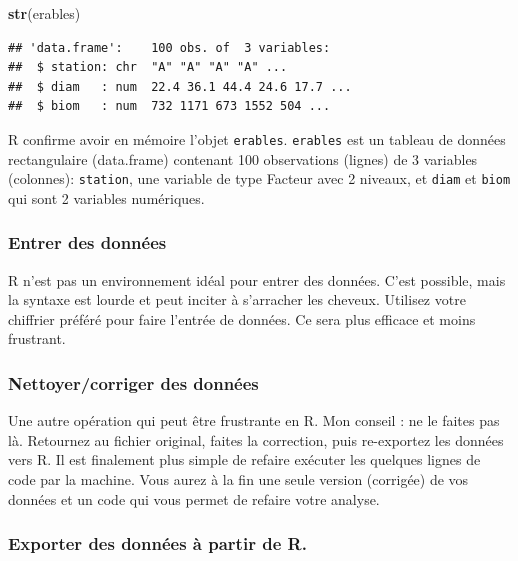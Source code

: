 \documentclass[12pt,]{book}
\newenvironment{Shaded}{\begin{snugshade}}{\end{snugshade}}
\newcommand{\KeywordTok}[1]{\textcolor[rgb]{0.13,0.29,0.53}{\textbf{#1}}}
\newcommand{\NormalTok}[1]{#1}
\begin{document}
\begin{Shaded}
\begin{Highlighting}[]
\KeywordTok{str}\NormalTok{(erables)}
\end{Highlighting}
\end{Shaded}

\begin{verbatim}
## 'data.frame':    100 obs. of  3 variables:
##  $ station: chr  "A" "A" "A" "A" ...
##  $ diam   : num  22.4 36.1 44.4 24.6 17.7 ...
##  $ biom   : num  732 1171 673 1552 504 ...
\end{verbatim}

R confirme avoir en mémoire l'objet \texttt{erables}.
\texttt{erables} est un tableau de données rectangulaire (data.frame) contenant 100 observations (lignes) de 3 variables (colonnes): \texttt{station}, une variable de type Facteur avec 2 niveaux, et \texttt{diam} et \texttt{biom} qui sont 2 variables numériques.

\hypertarget{entrer-des-donnuxe9es}{%
\subsubsection{Entrer des données}\label{entrer-des-donnuxe9es}}

R n'est pas un environnement idéal pour entrer des données.
C'est possible, mais la syntaxe est lourde et peut inciter à s'arracher les cheveux.
Utilisez votre chiffrier préféré pour faire l'entrée de données.
Ce sera plus efficace et moins frustrant.

\hypertarget{nettoyercorriger-des-donnuxe9es}{%
\subsubsection{Nettoyer/corriger des données}\label{nettoyercorriger-des-donnuxe9es}}

Une autre opération qui peut être frustrante en R.
Mon conseil : ne le faites pas là.
Retournez au fichier original, faites la correction, puis re-exportez les données vers R.
Il est finalement plus simple de refaire exécuter les quelques lignes de code par la machine.
Vous aurez à la fin une seule version (corrigée) de vos données et un code qui vous permet de refaire votre analyse.

\hypertarget{exporter-des-donnuxe9es-uxe0-partir-de-r.}{%
\subsubsection{Exporter des données à partir de R.}\label{exporter-des-donnuxe9es-uxe0-partir-de-r.}}
\end{document}
